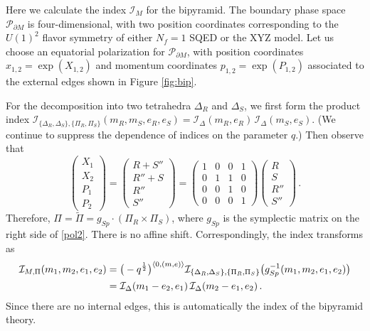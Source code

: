 \documentclass[11pt,letterpaper]{article}
\numberwithin{equation}{section}
\newcommand{\be}{\begin{equation}}
\newcommand{\ee}{\end{equation}}
\newcommand{\wt}{\widetilde}
\newcommand{\pd}{\partial}
\newcommand{\CI}{\mathcal{I}}
\newcommand{\CP}{\mathcal{P}}
\begin{document}
Here we calculate the index $\CI_M$ for the bipyramid. The boundary phase space $\CP_{\pd M}$ is four-dimensional, with two position coordinates corresponding to the $U(1)^2$ flavor symmetry of either $N_f=1$ SQED or the XYZ model. Let us choose an equatorial polarization for $\CP_{\pd M}$, with position coordinates $x_{1,2}=\exp(X_{1,2})$ and momentum coordinates $p_{1,2}=\exp(P_{1,2})$ associated to the external edges shown in Figure \ref{fig:bip}.

For the decomposition into two tetrahedra $\Delta_R$ and $\Delta_S$, we first form the product index $\CI_{\{\Delta_R,\Delta_S\},\{\Pi_R,\Pi_S\}}(m_R,m_S,e_R,e_S) = \CI_\Delta(m_R,e_R)\,\CI_\Delta(m_S,e_S)$. (We continue to suppress the dependence of indices on the parameter $q$.) Then observe that
%
\be \begin{pmatrix} X_1\\ X_2\\ P_1\\ P_2 \end{pmatrix}
 = \begin{pmatrix} R+S'' \\ R''+S \\ R'' \\ S'' \end{pmatrix}
 = \begin{pmatrix} 1 & 0 & 0 & 1 \\ 0 & 1 & 1 & 0 \\ 0 & 0 & 1 & 0 \\ 0 & 0 & 0 & 1 \end{pmatrix}
 \begin{pmatrix} R \\ S\\ R'' \\ S'' \end{pmatrix}\,.
\label{pol2}
\ee
%
Therefore, $\Pi = \wt\Pi = g_{Sp}\cdot (\Pi_R\times\Pi_S)$, where $g_{Sp}$ is the symplectic matrix on the right side of \eqref{pol2}. There is no affine shift. Correspondingly, the index transforms as
%
\begin{align} \CI_{M,\Pi}(m_1,m_2,e_1,e_2) &=
 \big(-q^{\frac12}\big)^{\langle 0,(m,e)\rangle}\CI_{\{\Delta_R,\Delta_S\},\{\Pi_R,\Pi_S\}}\big(g_{Sp}^{-1}(m_1,m_2,e_1,e_2)\big) \notag \\
  &= \CI_\Delta(m_1-e_2,e_1)\,\CI_\Delta(m_2-e_1,e_2)\,.
 \label{ind2}
\end{align}
%
Since there are no internal edges, this is automatically the index of the bipyramid theory.
\end{document}
